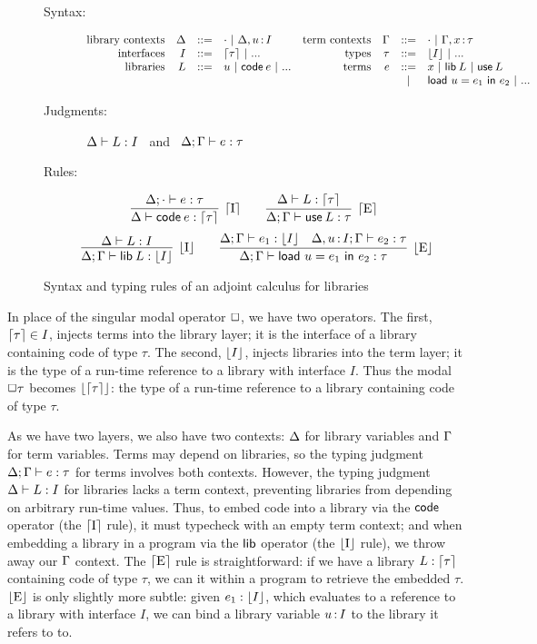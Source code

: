 \documentclass[11pt]{article}
\begin{document}
\begin{figure}[h]
  \centering
  \begin{description}
    \item[Syntax:]
    \[\begin{array}{rrclrrcl}
      \text{library contexts} & \Delta &::=& \cdot ~|~ \Delta, u \mathop{:} I &
      \text{term contexts} & \Gamma &::=& \cdot ~|~ \Gamma, x \mathop{:} \tau \\
      \text{interfaces} & I &::=& \lceil{\tau}\rceil ~|~ ... &
      \text{types} & \tau &::=& \lfloor{I}\rfloor ~|~ ...\\
      \text{libraries}& L &::=& u ~|~ \textsf{code}\:{e} ~|~ ... &
      \text{terms} & e &::=& x ~|~ \textsf{lib}\:{L} ~|~ \textsf{use}\:{L}\\
      &&&&&&~|~& \textsf{load}~{u}={e_1}~\textsf{in}~{e_2} ~|~ ...\\
    \end{array}\]
  \item[Judgments:]\ $\Delta \vdash L : I$ \ and
    \ $\Delta;\Gamma \vdash e : \tau$
  \item[Rules:]
    \[
    \infer[\upI]{\D \ent \code{e} \isa \up{\tau}}{
      \D;\ecx \ent e \isa \tau}
    \qquad
    \infer[\upE]{\D;\G \ent \use{L} \isa \tau}{
      \D \ent L \isa \up{\tau}}
    \]
    \[
    \infer[\dnI]{\D;\G \ent \lib{L} \isa \dn{I}}{
      \D \ent L \isa I}
    \qquad
    \infer[\dnE]{\D;\G \ent \load{u}{e_1}{e_2} \isa \tau}{
      \D;\G \ent e_1 \isa \dn{I} &
      \D,u \of I;\G \ent e_2 \isa \tau}
    \]
  \end{description}

  \caption{Syntax and typing rules of an adjoint calculus for libraries}
  \label{fig:adjoint}

\end{figure}

In place of the singular modal operator $\Box$, we have two operators. The
first, $\lceil{\tau}\rceil \in I$, injects terms into the library layer; it is the
interface of a library containing code of type $\tau$. The second, $\lfloor{I}\rfloor$,
injects libraries into the term layer; it is the type of a run-time reference to
a library with interface $I$. Thus the modal $\Box \tau$ becomes
$\lfloor{\lceil{\tau}\rceil}\rfloor$: the type of a run-time reference to a library containing code
of type $\tau$.

As we have two layers, we also have two contexts: $\Delta$ for library variables and
$\Gamma$ for term variables. Terms may depend on libraries, so the typing judgment
$\Delta;\Gamma \vdash e : \tau$ for terms involves both contexts. However, the typing
judgment $\Delta \vdash L : I$ for libraries lacks a term context, preventing
libraries from depending on arbitrary run-time values. Thus, to embed code into
a library via the $\textsf{code}$ operator (the $\lceil{\text{I}}\rceil$ rule), it must typecheck with
an empty term context; and when embedding a library in a program via the
$\textsf{lib}$ operator (the $\lfloor{\text{I}}\rfloor$ rule), we throw away our $\Gamma$ context. The
$\lceil{\text{E}}\rceil$ rule is straightforward: if we have a library $L : \lceil{\tau}\rceil$
containing code of type $\tau$, we can  it within a program to retrieve
the embedded $\tau$. $\lfloor{\text{E}}\rfloor$ is only slightly more subtle: given $e_1 :
\lfloor{I}\rfloor$, which evaluates to a reference to a library with interface $I$, we can
bind a library variable $u \mathop{:} I$ to the library it refers to to.
\end{document}
